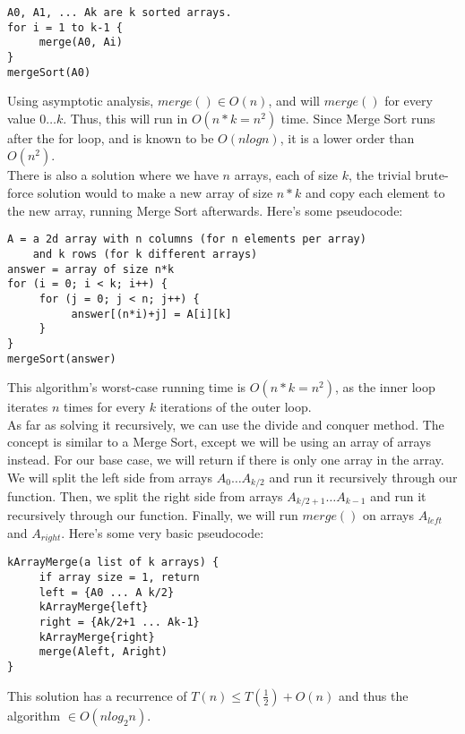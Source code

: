 \documentclass[a4paper,12pt]{article}
\begin{document}
\begin{verbatim}
A0, A1, ... Ak are k sorted arrays.
for i = 1 to k-1 {
     merge(A0, Ai)
}
mergeSort(A0)
\end{verbatim}

Using asymptotic analysis, $merge() \in O(n)$, and will $merge()$ for every value $0 \ldots k$. Thus, this will run in $O(n*k = n^2)$ time. Since Merge Sort runs after the for loop, and is known to be $O(nlogn)$, it is a lower order than $O(n^2)$.\\

There is also a solution where we have $n$ arrays, each of size $k$, the trivial brute-force solution would to make a new array of size $n*k$ and copy each element to the new array, running Merge Sort afterwards. Here's some pseudocode:\\

\begin{verbatim}
A = a 2d array with n columns (for n elements per array) 
    and k rows (for k different arrays)
answer = array of size n*k
for (i = 0; i < k; i++) {
     for (j = 0; j < n; j++) {
          answer[(n*i)+j] = A[i][k]
     }
}
mergeSort(answer)
\end{verbatim}

This algorithm's worst-case running time is $O(n*k=n^2)$, as the inner loop iterates $n$ times for every $k$ iterations of the outer loop.\\

As far as solving it recursively, we can use the divide and conquer method. The concept is similar to a Merge Sort, except we will be using an array of arrays instead. For our base case, we will return if there is only one array in the array. We will split the left side from arrays $A_0 \ldots A_{k/2}$ and run it recursively through our function. Then, we split the right side from arrays $A_{k/2+1} \ldots A_{k-1}$ and run it recursively through our function. Finally, we will run $merge()$ on arrays $A_{left}$ and $A_{right}$. Here's some very basic pseudocode:\\

\begin{verbatim}
kArrayMerge(a list of k arrays) {
     if array size = 1, return
     left = {A0 ... A k/2}
     kArrayMerge{left}
     right = {Ak/2+1 ... Ak-1}
     kArrayMerge{right}
     merge(Aleft, Aright)
}
\end{verbatim}
 
This solution has a recurrence of $T(n) \leq T(\frac{1}{2})+ O(n)$ and thus the algorithm $\in O(nlog_2n)$.\\
\end{document}
